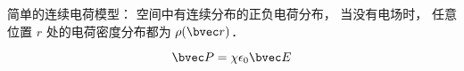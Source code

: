 
简单的连续电荷模型： 空间中有连续分布的正负电荷分布， 当没有电场时， 任意位置 $r$ 处的电荷密度分布都为 $\rho(\bvec r)$．

\begin{equation}
\bvec P = \chi \epsilon_0 \bvec E
\end{equation}
